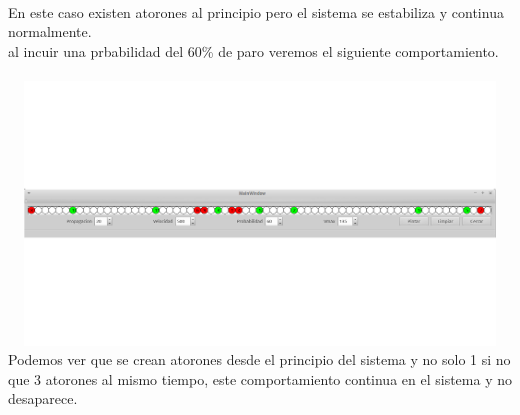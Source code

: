 \documentclass[a4paper,10pt]{article}
\begin{document}
\\
En este caso existen atorones al principio pero el sistema se estabiliza y continua normalmente.\\
al incuir una prbabilidad del 60\% de paro veremos el siguiente comportamiento.
\\ \\
\includegraphics[width=15cm, height=7cm]{22}
\\
Podemos ver que se crean atorones desde el principio del sistema y no solo 1 si no que 3 atorones al mismo tiempo, este comportamiento continua en el sistema y no desaparece.
\end{document}
